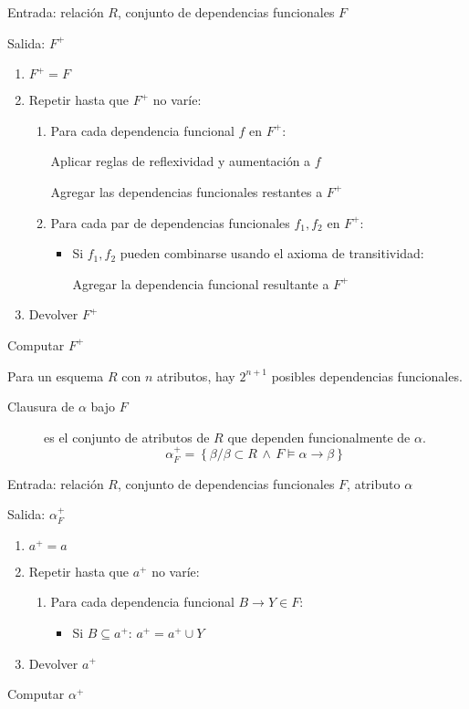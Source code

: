 \documentclass[a4paper, twoside]{article}
\begin{document}
\begin{algorithm}[H]
	Entrada: relación $R$, conjunto de dependencias funcionales $F$

	Salida: $F^{+}$
	\begin{enumerate}
		\item $F^{+}=F$

		\item Repetir hasta que $F^{+}$ no varíe:
		\begin{enumerate}
			\item Para cada dependencia funcional $f$ en $F^{+}$:

			Aplicar reglas de reflexividad y aumentación a $f$

			Agregar las dependencias funcionales restantes a $F^{+}$

			\item Para cada par de dependencias funcionales $f_{1},f_{2}$ en $F^{+}$:
			\begin{itemize}
				\item Si $f_{1},f_{2}$ pueden combinarse usando el axioma de transitividad:

				Agregar la dependencia funcional resultante a $F^{+}$
			\end{itemize}
		\end{enumerate}

		\item Devolver $F^{+}$
	\end{enumerate}
	\caption{Computar $F^{+}$}
\end{algorithm}

Para un esquema $R$ con $n$ atributos, hay $2^{n+1}$ posibles dependencias funcionales.

\begin{description}
	\item[Clausura de $\alpha$ bajo $F$] es el conjunto de atributos de $R$ que dependen funcionalmente de $\alpha$.
	\[
		\alpha_{F}^{+}=\left\{ \beta/\beta\subset R\,\wedge\, F\vDash\alpha\to\beta\right\} 
	\]
\end{description}

\begin{algorithm}[H]
	Entrada: relación $R$, conjunto de dependencias funcionales $F$, atributo $\alpha$

	Salida: $\alpha_{F}^{+}$
	\begin{enumerate}
		\item $a^{+} = a$

		\item Repetir hasta que $a^{+}$ no varíe:
		\begin{enumerate}
			\item Para cada dependencia funcional $B\to Y\in F$:
			\begin{itemize}
				\item Si $B \subseteq a^{+}$: $a^{+} = a^{+}\cup Y$
			\end{itemize}
		\end{enumerate}
		
		\item Devolver $a^{+}$
	\end{enumerate}
	\caption{Computar $\alpha^{+}$}
\end{algorithm}
\end{document}
